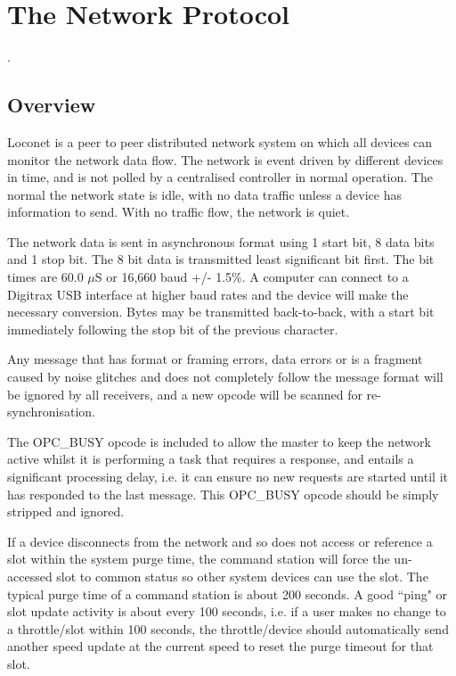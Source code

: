  

\chapter[Network Protocol]{The Network Protocol}.  

\section{Overview}

Loconet is a peer to peer distributed network system on which all devices can monitor the network data flow. The network is event driven by different devices in time, and is not polled by a centralised controller in normal operation. The normal the network state is idle, with no data traffic unless a device has information to send. With no traffic flow, the network is quiet.

The network data is sent in asynchronous format using 1 start bit, 8 data bits and 1 stop bit. The 8 bit data is transmitted least significant bit first. The bit times are 60.0 $\mu$S or 16,660 baud +/- 1.5\%. A computer can connect to a Digitrax USB interface at higher baud rates and the device will make the necessary conversion. Bytes may be transmitted back-to-back, with a start bit immediately following the stop bit of the previous character. 

Any message that has format or framing errors, data errors or is a fragment caused by noise glitches and does not completely follow the message format will be ignored by all receivers, and a new opcode will be scanned for re-synchronisation.

The OPC\_BUSY opcode is included to allow the master to keep the network active whilst it is performing a task that requires a response, and entails a significant processing delay, i.e. it can ensure no new requests are started until it has responded to the last message. This OPC\_BUSY opcode should be simply stripped and ignored.

If a device disconnects from the network and so does not access or reference a slot within the system purge time, the command station will force the un-accessed slot to common status so other system devices can use the slot. The typical purge time of a command station is about 200 seconds. A good ``ping" or slot update activity is about every 100 seconds, i.e. if a user makes no change to a throttle/slot within 100 seconds, the throttle/device should automatically send another speed update at the current speed to reset the purge timeout for that slot.

